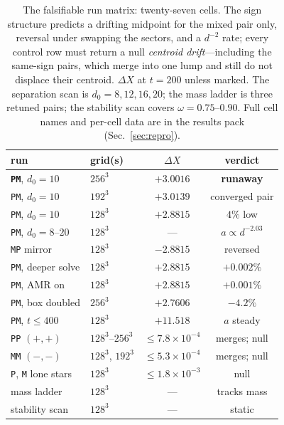 \documentclass[twocolumn,floatfix,aps,prd,nofootinbib]{revtex4-2}
\begin{document}
\begin{table}[t]
\caption{The falsifiable run matrix: twenty-seven cells. The sign structure predicts a drifting midpoint for the mixed pair only, reversal under swapping the sectors, and a $d^{-2}$ rate; every control row must return a null \emph{centroid drift}---including the same-sign pairs, which merge into one lump and still do not displace their centroid. $\Delta X$ at $t=200$ unless marked. The separation scan is $d_0=8,12,16,20$; the mass ladder is three retuned pairs; the stability scan covers $\omega=0.75$--$0.90$. Full cell names and per-cell data are in the results pack (Sec.~\ref{sec:repro}).}
\label{tab:matrix}
\begin{ruledtabular}
\begin{tabular}{llcc}
run & grid(s) & $\Delta X$ & verdict \\
\hline
\textbf{\texttt{PM}}, $d_0{=}10$ & $256^3$ & $\mathbf{+3.0016}$ & \textbf{runaway} \\
\texttt{PM}, $d_0{=}10$ & $192^3$ & $+3.0139$ & converged pair \\
\texttt{PM}, $d_0{=}10$ & $128^3$ & $+2.8815$ & $4\%$ low \\
\texttt{PM}, $d_0{=}8$--$20$ & $128^3$ & --- & $a\propto d^{-2.03}$ \\
\texttt{MP} mirror & $128^3$ & $-2.8815$ & reversed\footnotemark[1] \\
\texttt{PM}, deeper solve & $128^3$ & $+2.8815$ & $+0.002\%$ \\
\texttt{PM}, AMR on & $128^3$ & $+2.8815$ & $+0.001\%$ \\
\texttt{PM}, box doubled & $256^3$ & $+2.7606$ & $-4.2\%$ \\
\texttt{PM}, $t\le400$ & $128^3$ & $+11.518$ & $a$ steady \\
\texttt{PP} $(+,+)$\footnotemark[2] & $128^3$--$256^3$ & $\le7.8\times10^{-4}$ & merges; null \\
\texttt{MM} $(-,-)$\footnotemark[2] & $128^3$, $192^3$ & $\le5.3\times10^{-4}$ & merges; null \\
\texttt{P}, \texttt{M} lone stars\footnotemark[3] & $128^3$ & $\le1.8\times10^{-3}$ & null \\
mass ladder & $128^3$ & --- & tracks mass \\
stability scan & $128^3$ & --- & static \\
\end{tabular}
\end{ruledtabular}
\end{table}
\end{document}

